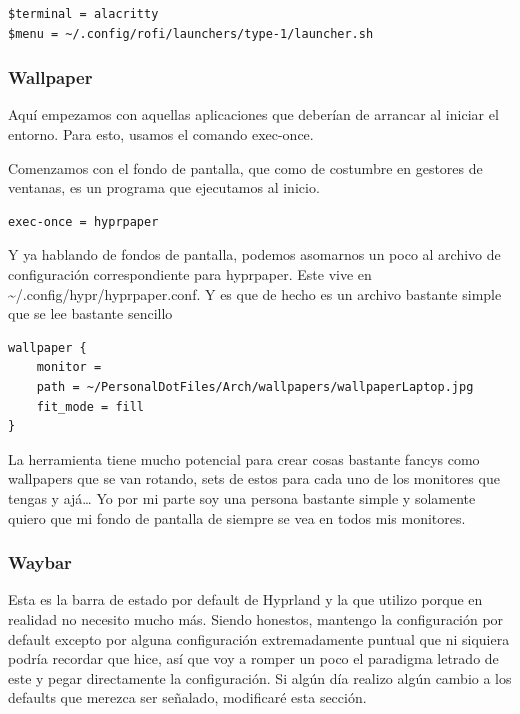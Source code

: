 \documentclass[11pt]{article}
\begin{document}
\begin{verbatim}
$terminal = alacritty
$menu = ~/.config/rofi/launchers/type-1/launcher.sh

\end{verbatim}
\subsubsection{Wallpaper}
\label{sec:org5ea2095}

Aquí empezamos con aquellas aplicaciones que deberían de arrancar al iniciar el entorno. Para esto, usamos el comando exec-once.

Comenzamos con el fondo de pantalla, que como de costumbre en gestores de ventanas, es un programa que ejecutamos al inicio.

\begin{verbatim}
exec-once = hyprpaper
\end{verbatim}

Y ya hablando de fondos de pantalla, podemos asomarnos un poco al archivo de configuración correspondiente para hyprpaper. Este vive en \textasciitilde{}/.config/hypr/hyprpaper.conf. Y es que de hecho es un archivo bastante simple que se lee bastante sencillo

\begin{verbatim}
wallpaper {
    monitor =
    path = ~/PersonalDotFiles/Arch/wallpapers/wallpaperLaptop.jpg
    fit_mode = fill
}
\end{verbatim}

La herramienta tiene mucho potencial para crear cosas bastante fancys como wallpapers que se van rotando, sets de estos para cada uno de los monitores que tengas y ajá\ldots{} Yo por mi parte soy una persona bastante simple y solamente quiero que mi fondo de pantalla de siempre se vea en todos mis monitores.
\subsubsection{Waybar}
\label{sec:orga91337c}

Esta es la barra de estado por default de Hyprland y la que utilizo porque en realidad no necesito mucho más. Siendo honestos, mantengo la configuración por default excepto por alguna configuración extremadamente puntual que ni siquiera podría recordar que hice, así que voy a romper un poco el paradigma letrado de este y pegar directamente la configuración. Si algún día realizo algún cambio a los defaults que merezca ser señalado, modificaré esta sección.
\end{document}
